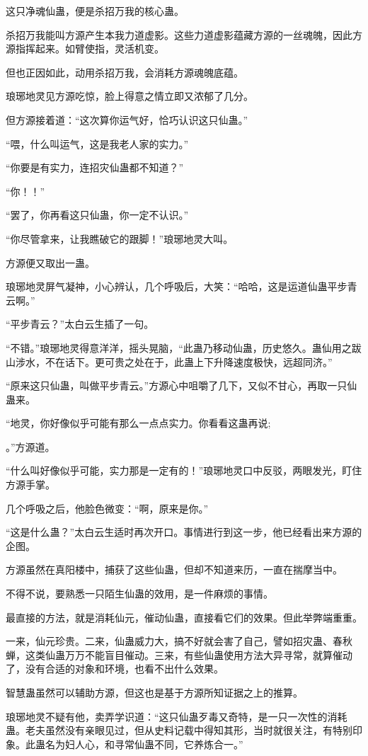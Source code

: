 \begin{this_body}
这只净魂仙蛊，便是杀招万我的核心蛊。

杀招万我能叫方源产生本我力道虚影。这些力道虚影蕴藏方源的一丝魂魄，因此方源指挥起来。如臂使指，灵活机变。

但也正因如此，动用杀招万我，会消耗方源魂魄底蕴。

琅琊地灵见方源吃惊，脸上得意之情立即又浓郁了几分。

但方源接着道：“这次算你运气好，恰巧认识这只仙蛊。”

“喂，什么叫运气，这是我老人家的实力。”

“你要是有实力，连招灾仙蛊都不知道？”

“你！！”

“罢了，你再看这只仙蛊，你一定不认识。”

“你尽管拿来，让我瞧破它的跟脚！”琅琊地灵大叫。

方源便又取出一蛊。

琅琊地灵屏气凝神，小心辨认，几个呼吸后，大笑：“哈哈，这是运道仙蛊平步青云啊。”

“平步青云？”太白云生插了一句。

“不错。”琅琊地灵得意洋洋，摇头晃脑，“此蛊乃移动仙蛊，历史悠久。蛊仙用之跋山涉水，不在话下。更可贵之处在于，此蛊上下升降速度极快，远超同济。”

“原来这只仙蛊，叫做平步青云。”方源心中咀嚼了几下，又似不甘心，再取一只仙蛊来。

“地灵，你好像似乎可能有那么一点点实力。你看看这蛊再说;

。”方源道。

“什么叫好像似乎可能，实力那是一定有的！”琅琊地灵口中反驳，两眼发光，盯住方源手掌。

几个呼吸之后，他脸色微变：“啊，原来是你。”

“这是什么蛊？”太白云生适时再次开口。事情进行到这一步，他已经看出来方源的企图。

方源虽然在真阳楼中，捕获了这些仙蛊，但却不知道来历，一直在揣摩当中。

不得不说，要熟悉一只陌生仙蛊的效用，是一件麻烦的事情。

最直接的方法，就是消耗仙元，催动仙蛊，直接看它们的效果。但此举弊端重重。

一来，仙元珍贵。二来，仙蛊威力大，搞不好就会害了自己，譬如招灾蛊、春秋蝉，这类仙蛊万万不能盲目催动。三来，有些仙蛊使用方法大异寻常，就算催动了，没有合适的对象和环境，也看不出什么效果。

智慧蛊虽然可以辅助方源，但这也是基于方源所知证据之上的推算。

琅琊地灵不疑有他，卖弄学识道：“这只仙蛊歹毒又奇特，是一只一次性的消耗蛊。老夫虽然没有亲眼见过，但从史料记载中得知其形，当时就很关注，有特别印象。此蛊名为妇人心，和寻常仙蛊不同，它养炼合一。”


\end{this_body}
